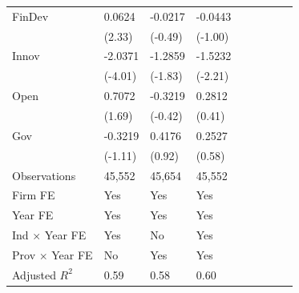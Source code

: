 \begin{table}[htbp]
\begin{tabularx}{\textwidth}{lYYYYYYYY@{}}
FinDev          &   0.0624\sym{**} &  -0.0217         &  -0.0443         \\
                &   (2.33)         &  (-0.49)         &  (-1.00)         \\
Innov           &  -2.0371\sym{***}&  -1.2859\sym{*}  &  -1.5232\sym{**} \\
                &  (-4.01)         &  (-1.83)         &  (-2.21)         \\
Open            &   0.7072\sym{*}  &  -0.3219         &   0.2812         \\
                &   (1.69)         &  (-0.42)         &   (0.41)         \\
Gov             &  -0.3219         &   0.4176         &   0.2527         \\
                &  (-1.11)         &   (0.92)         &   (0.58)         \\
\hline
Observations    &   45,552         &   45,654         &   45,552         \\
Firm FE         &      Yes         &      Yes         &      Yes         \\
Year FE         &      Yes         &      Yes         &      Yes         \\
Ind $\times$ Year FE&      Yes         &       No         &      Yes         \\
Prov $\times$ Year FE&       No         &      Yes         &      Yes         \\
Adjusted $ R^2$ &     0.59         &     0.58         &     0.60         \\
\bottomrule
\end{tabularx}
\end{table}
